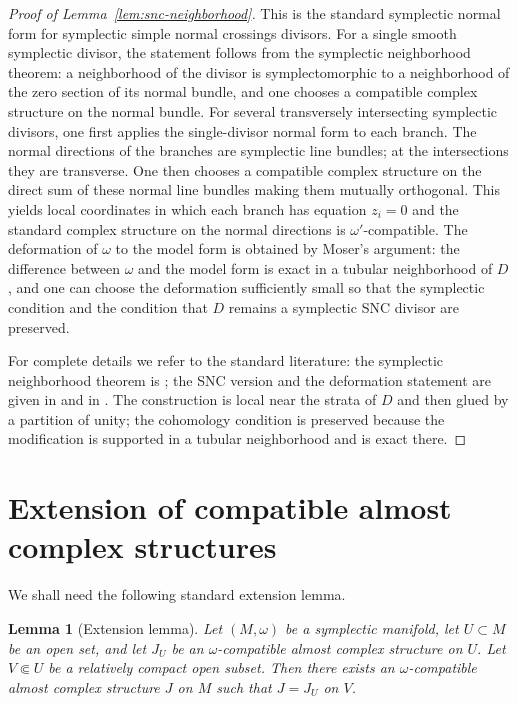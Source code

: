 \documentclass[11pt]{article}
\newtheorem{lemma}[theorem]{Lemma}
\theoremstyle{definition}
\theoremstyle{remark}
\begin{document}
\begin{proof}[Proof of Lemma~\ref{lem:snc-neighborhood}]
This is the standard symplectic normal form for symplectic simple normal crossings divisors. For a single smooth symplectic divisor, the statement follows from the symplectic neighborhood theorem: a neighborhood of the divisor is symplectomorphic to a neighborhood of the zero section of its normal bundle, and one chooses a compatible complex structure on the normal bundle. For several transversely intersecting symplectic divisors, one first applies the single-divisor normal form to each branch. The normal directions of the branches are symplectic line bundles; at the intersections they are transverse. One then chooses a compatible complex structure on the direct sum of these normal line bundles making them mutually orthogonal. This yields local coordinates in which each branch has equation \(z_i=0\) and the standard complex structure on the normal directions is \(\omega'\)-compatible. The deformation of \(\omega\) to the model form is obtained by Moser's argument: the difference between \(\omega\) and the model form is exact in a tubular neighborhood of \(D\), and one can choose the deformation sufficiently small so that the symplectic condition and the condition that \(D\) remains a symplectic SNC divisor are preserved. 

For complete details we refer to the standard literature: the symplectic neighborhood theorem is \cite[Theorem 3.3.3]{McDuffSalamon}; the SNC version and the deformation statement are given in \cite[Chapter 2]{GompfStipsicz} and in \cite{Auroux}. The construction is local near the strata of \(D\) and then glued by a partition of unity; the cohomology condition is preserved because the modification is supported in a tubular neighborhood and is exact there.
\end{proof}

\section{Extension of compatible almost complex structures}

We shall need the following standard extension lemma.

\begin{lemma}[Extension lemma]\label{lem:extension}
Let \((M,\omega)\) be a symplectic manifold, let \(U\subset M\) be an open set, and let \(J_U\) be an \(\omega\)-compatible almost complex structure on \(U\). Let \(V\Subset U\) be a relatively compact open subset. Then there exists an \(\omega\)-compatible almost complex structure \(J\) on \(M\) such that \(J=J_U\) on \(V\).
\end{lemma}
\end{document}
